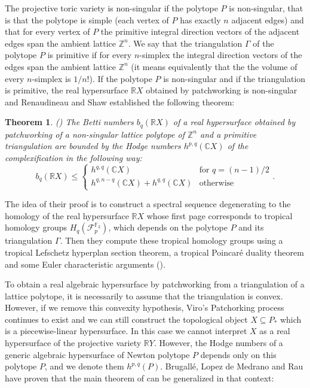 \documentclass{article}
\newtheorem{theorem}{Theorem}
\begin{document}
The projective toric variety is non-singular if the polytope $P$ is non-singular, that is that the polytope is simple (each vertex of $P$ has exactly $n$ adjacent edges) and that for every vertex of $P$ the primitive integral direction vectors of the adjacent edges span the ambient lattice $\mathbb{Z}^n$. We say that the triangulation $\Gamma$ of the polytope $P$ is primitive if for every $n$-simplex the integral direction vectors of the edges span the ambient lattice $\mathbb{Z}^n$ (it means equivalently that the the volume of every $n$-simplex is $1/n!$). If the polytope $P$ is non-singular and if the triangulation is primitive, the real hypersurface $\mathbb{R}X$ obtained by patchworking is non-singular and Renaudineau and Shaw established the following theorem:

\begin{theorem}
    (\cite{RS 2023}) The Betti numbers $b_q(\mathbb{R}X)$ of a real hypersurface obtained by patchworking of a non-singular lattice polytope of $\mathbb{Z}^n$ and a primitive triangulation are bounded by the Hodge numbers $h^{p,q}(\mathbb{C}X)$ of the complexification in the following way:
    \begin{equation*}
        b_q(\mathbb{R}X) \leq \left \{ \begin{array}{ll}
            h^{q,q}(\mathbb{C}X) & \text{for } q = (n-1)/2 \\
            h^{q,n-q}(\mathbb{C}X) + h^{q,q}(\mathbb{C}X) & \text{otherwise} 
        \end{array} \right. .
    \end{equation*}
    \label{RS}
\end{theorem}

The idea of their proof is to construct a spectral sequence degenerating to the homology of the real hypersurface $\mathbb{R}X$ whose first page corresponds to tropical homology groups $H_q(\mathcal{F}_p^{\mathbb{F}_2})$, which depends on the polytope $P$ and its triangulation $\Gamma$. Then they compute these tropical homology groups using a tropical Lefschetz hyperplan section theorem, a tropical Poincaré duality theorem and some Euler characteristic arguments (\cite{ARS 2021}).

To obtain a real algebraic hypersurface by patchworking from a triangulation of a lattice polytope, it is necessarily to assume that the triangulation is convex. However, if we remove this convexity hypothesis, Viro's Patchorking process continues to exist and we can still construct the topological object $X \subseteq P_*$ which is a piecewise-linear hypersurface. In this case we cannot interpret $X$ as a real hypersurface of the projective variety $\mathbb{R}Y$. However, the Hodge numbers of a generic algebraic hypersurface of Newton polytope $P$ depends only on this polytope $P$, and we denote them $h^{p,q}(P)$. Brugallé, Lopez de Medrano and Rau have proven that the main theorem of \cite{RS 2023} can be generalized in that context:
\end{document}
